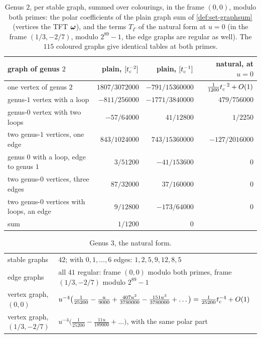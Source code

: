\begin{table}[ht]
\centering\small\setlength{\tabcolsep}{4pt}
\begin{tabular}{l|r|r|r}
graph of genus $2$ & plain, $[t_{\mathrm{c}}^{-2}]$ & plain, $[t_{\mathrm{c}}^{-1}]$ & natural, at $u=0$\\ \hline
one vertex of genus $2$ & $1807/3072000$ & $-791/15360000$ & $\tfrac{1}{1200}t_{\mathrm{c}}^{-2}+O(1)$\\
genus-$1$ vertex with a loop & $-811/256000$ & $-1771/3840000$ & $479/756000$\\
genus-$0$ vertex with two loops & $-57/64000$ & $41/12800$ & $1/2250$\\
two genus-$1$ vertices, one edge & $843/1024000$ & $743/15360000$ & $-127/2016000$\\
genus $0$ with a loop, edge to genus $1$ & $3/51200$ & $-41/153600$ & $0$\\
two genus-$0$ vertices, three edges & $87/32000$ & $37/160000$ & $0$\\
two genus-$0$ vertices with loops, an edge & $9/12800$ & $-173/64000$ & $0$\\ \hline
sum & $1/1200$ & $0$ & \\
\end{tabular}
\caption{Genus $2$, per stable graph, summed over colourings, in the frame $(0,0)$, modulo both primes: the polar coefficients of the plain graph sum of \cref{def:set-graphsum} (vertices the TFT $\boldsymbol{\omega}$), and the terms $T_\Gamma$ of the natural form at $u=0$ (in the frame $(1/3,-2/7)$, modulo $2^{89}-1$, the edge graphs are regular as well). The $115$ coloured graphs give identical tables at both primes.}
\label{tab:evi-g2}
\end{table}

\begin{table}[ht]
\centering\small
\begin{tabular}{l|p{}}
stable graphs & $42$; with $0,1,\dots,6$ edges: $1,2,5,9,12,8,5$\\
edge graphs & all $41$ regular: frame $(0,0)$ modulo both primes, frame $(1/3,-2/7)$ modulo $2^{89}-1$\\
vertex graph, $(0,0)$ & $u^{-4}\bigl(\tfrac{1}{25200}-\tfrac{u}{9000}+\tfrac{407u^2}{3780000}-\tfrac{151u^3}{3780000}+\dots\bigr)=\tfrac{1}{25200}t_{\mathrm{c}}^{-4}+O(1)$\\
vertex graph, $(1/3,-2/7)$ & $u^{-4}\bigl(\tfrac{1}{25200}-\tfrac{11u}{189000}+\dots\bigr)$, with the same polar part\\
\end{tabular}
\caption{Genus $3$, the natural form.}
\label{tab:evi-g3}
\end{table}

